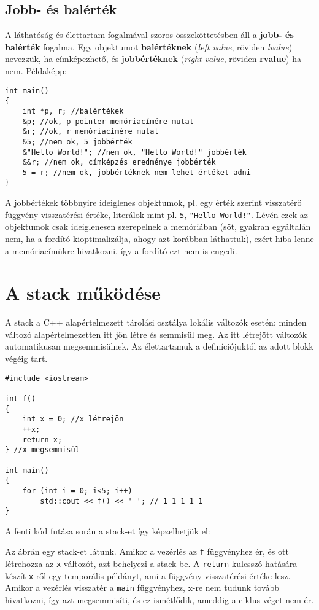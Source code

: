 \documentclass[../cpp_book/cpp_book.tex]{subfiles}
\begin{document}
	\subsection{Jobb- és balérték}
	A láthatóság és élettartam fogalmával szoros összeköttetésben áll a \textbf{jobb- és balérték} fogalma. Egy objektumot \textbf{balértéknek} (\textit{left value}, röviden \textit{lvalue}) nevezzük, ha címképezhető, és \textbf{jobbértéknek} (\textit{right value}, röviden \textbf{rvalue}) ha nem. Példaképp:
	\begin{lstlisting}
int main()
{
	int *p, r; //balértékek
	&p; //ok, p pointer memóriacímére mutat
	&r; //ok, r memóriacímére mutat
	&5; //nem ok, 5 jobbérték
	&"Hello World!"; //nem ok, "Hello World!" jobbérték
	&&r; //nem ok, címképzés eredménye jobbérték
	5 = r; //nem ok, jobbértéknek nem lehet értéket adni
}
	\end{lstlisting}
	A jobbértékek többnyire ideiglenes objektumok, pl. egy érték szerint visszatérő függvény visszatérési értéke,  literálok mint pl. \texttt{5}, \texttt{"Hello World!"}. Lévén ezek az objektumok csak ideiglenesen szerepelnek a memóriában (sőt, gyakran egyáltalán nem, ha a fordító kioptimalizálja, ahogy azt korábban láthattuk), ezért hiba lenne a memóriacímükre hivatkozni, így a fordító ezt nem is engedi.
	\section{A stack működése}
	A stack a C++ alapértelmezett tárolási osztálya lokális változók esetén: minden változó alapértelmezetten itt jön létre és semmisül meg. Az itt létrejött változók automatikusan megsemmisülnek. Az élettartamuk a definíciójuktól az adott blokk végéig tart.
	
	\begin{lstlisting}
#include <iostream>

int f()
{
	int x = 0; //x létrejön
	++x;
	return x;
} //x megsemmisül

int main()
{
	for (int i = 0; i<5; i++)
		std::cout << f() << ' '; // 1 1 1 1 1
}
	\end{lstlisting}
	\medskip
	
	A fenti kód futása során a stack-et így képzelhetjük el:
	
	\begin{figure}[!h]
		\centering
		
		
		\smallskip
		\caption{}\label{fig_stack_example}
	\end{figure}
	Az ábrán egy stack-et látunk. Amikor a vezérlés az \texttt{f} függvényhez ér, és ott létrehozza az \texttt{x} változót, azt behelyezi a stack-be. A \texttt{return} kulcsszó hatására készít \texttt{x}-ről egy temporális példányt, ami a függvény visszatérési értéke lesz. Amikor a vezérlés visszatér a \texttt{main} függvényhez, {x}-re nem tudunk tovább hivatkozni, így azt megsemmisíti, és ez ismétlődik, ameddig a ciklus véget nem ér.
	\smallskip
	
\end{document}
